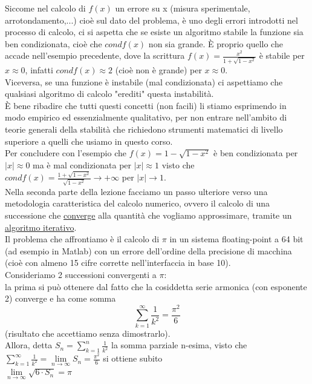 \documentclass[12pt]{article}
\begin{document}
Siccome nel calcolo di $f(x)$ un errore su x (misura sperimentale, arrotondamento,...) cioè sul dato del problema, è uno degli errori introdotti nel processo di calcolo, ci si aspetta che se esiste un algoritmo stabile la funzione sia ben condizionata,
cioè che $condf(x)$ non sia grande. È proprio quello che accade nell'esempio precedente, dove la scrittura $f(x) = \frac{x^2}{1+\sqrt{1-x^2}}$ è stabile per $x\approx 0$, infatti $condf(x)\approx 2$ (cioè non è grande) per $x\approx 0$.\\
Viceversa, se una funzione è instabile (mal condizionata) ci aspettiamo che qualsiasi algoritmo di calcolo "erediti" questa instabilità.\\
È bene ribadire che tutti questi concetti (non facili) li stiamo esprimendo in modo empirico ed essenzialmente qualitativo, per non entrare nell'ambito di teorie generali della stabilità che richiedono strumenti matematici di livello superiore a quelli che usiamo in questo corso.\\
Per concludere con l'esempio che $f(x) = 1-\sqrt{1-x^2}$ è ben condizionata per $|x|\approx 0$ ma è mal condizionata per $|x| \approx 1$ visto che $condf(x) = \frac{1+\sqrt{1-x^2}}{\sqrt{1-x^2}} \to +\infty$ per $|x| \to 1$.\\
Nella seconda parte della lezione facciamo un passo ulteriore verso una metodologia caratteristica del calcolo numerico, ovvero il calcolo di una successione che \underline{converge} alla quantità che vogliamo approssimare, tramite un \underline{algoritmo iterativo}.\\
Il problema che affrontiamo è il calcolo di $\pi$ in un sistema floating-point a 64 bit (ad esempio in Matlab) con un errore dell'ordine della precisione di 
macchina (cioè con almeno 15 cifre corrette nell'interfaccia in base 10).\\
Consideriamo 2 successioni convergenti a $\pi$:\\
la prima si può ottenere dal fatto che la cosiddetta serie armonica (con esponente 2) converge e ha come somma
\begin{equation}
        \sum\limits_{k=1}^\infty \frac{1}{k^2} = \frac{\pi^2}{6}
\end{equation}
(risultato che accettiamo senza dimostrarlo).\\
Allora, detta $S_n = \sum\limits_{k=1}^n \frac{1}{k^2}$ la somma parziale n-esima, visto che $\sum\limits_{k=1}^\infty \frac{1}{k^2} = \lim\limits_{n \to \infty} S_n = \frac{\pi^2}{6}$ si ottiene subito\\
$\lim\limits_{n \to \infty} \sqrt{6\cdot S_n} = \pi$\\
\end{document}
